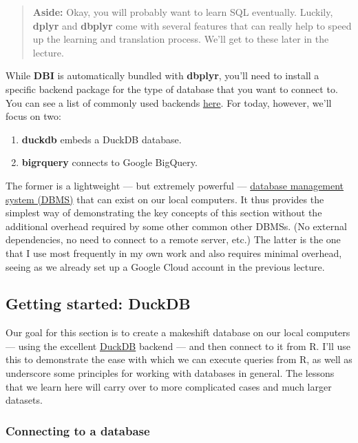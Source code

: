 \documentclass[
]{article}
\providecommand{\tightlist}{%
  \setlength{\itemsep}{0pt}\setlength{\parskip}{0pt}}
\begin{document}
\begin{quote}
\textbf{Aside:} Okay, you will probably want to learn SQL eventually.
Luckily, \textbf{dplyr} and \textbf{dbplyr} come with several features
that can really help to speed up the learning and translation process.
We'll get to these later in the lecture.
\end{quote}

While \textbf{DBI} is automatically bundled with \textbf{dbplyr}, you'll
need to install a specific backend package for the type of database that
you want to connect to. You can see a list of commonly used backends
\href{https://db.rstudio.com/dplyr/\#getting-started}{here}. For today,
however, we'll focus on two:

\begin{enumerate}
\def\labelenumi{\arabic{enumi}.}
\tightlist
\item
  \textbf{duckdb} embeds a DuckDB database.
\item
  \textbf{bigrquery} connects to Google BigQuery.
\end{enumerate}

The former is a lightweight --- but extremely powerful ---
\href{https://en.wikipedia.org/wiki/Database\#Database_management_system}{database
management system (DBMS)} that can exist on our local computers. It thus
provides the simplest way of demonstrating the key concepts of this
section without the additional overhead required by some other common
other DBMSs. (No external dependencies, no need to connect to a remote
server, etc.) The latter is the one that I use most frequently in my own
work and also requires minimal overhead, seeing as we already set up a
Google Cloud account in the previous lecture.

\hypertarget{getting-started-duckdb}{%
\subsection{Getting started: DuckDB}\label{getting-started-duckdb}}

Our goal for this section is to create a makeshift database on our local
computers --- using the excellent
\href{https://duckdb.org/docs/api/r}{DuckDB} backend --- and then
connect to it from R. I'll use this to demonstrate the ease with which
we can execute queries from R, as well as underscore some principles for
working with databases in general. The lessons that we learn here will
carry over to more complicated cases and much larger datasets.

\hypertarget{connecting-to-a-database}{%
\subsubsection{Connecting to a
database}\label{connecting-to-a-database}}
\end{document}
